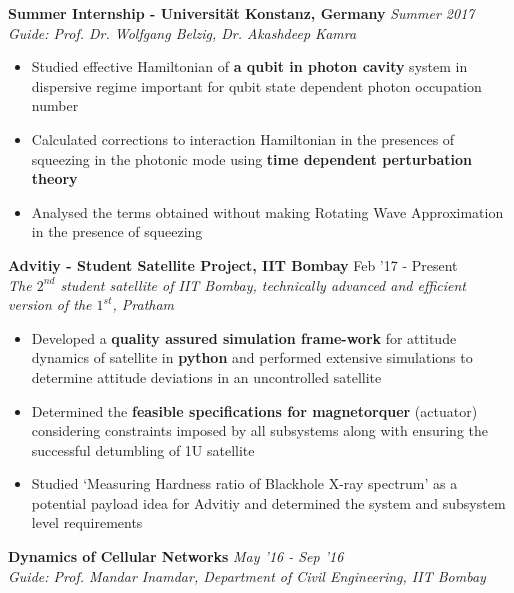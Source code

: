 \documentclass[10pt]{article}%
\begin{document}
{{\flushleft \bf \large{Summer Internship - Universit\"{a}t Konstanz, Germany}}  \hfill \textit{Summer 2017} \\
{\em Guide: Prof. Dr. Wolfgang Belzig, Dr. Akashdeep Kamra }\\
\vspace{-5mm}
\begin{itemize}
    \setlength\itemsep{0.01em}
    \item Studied effective Hamiltonian of \textbf{a qubit in photon cavity} system in dispersive regime important for qubit state dependent photon occupation number
    \item Calculated corrections to interaction Hamiltonian in the presences of squeezing in the photonic mode using \textbf{time dependent perturbation theory}
    \item Analysed the terms obtained without making Rotating Wave Approximation in the presence of squeezing
\end{itemize}

{\flushleft \bf \large{Advitiy - Student Satellite Project, IIT Bombay}}  \hfill {{{Feb '17 - Present}}} \\
{\em The $\mathit{2^{nd}}$ student satellite of IIT Bombay, technically advanced and efficient version of the $\mathit{1^{st}}$, Pratham} 

\begin{itemize}
    \setlength\itemsep{0.01em}
    \item Developed a \textbf{quality assured simulation frame-work} for attitude dynamics of satellite in \textbf{python} and performed
extensive simulations to determine attitude deviations in an uncontrolled satellite
    \item Determined the \textbf{feasible specifications for magnetorquer} (actuator) considering constraints imposed by all subsystems along with ensuring the successful detumbling of 1U satellite 
    \item Studied `Measuring Hardness ratio of Blackhole X-ray spectrum' as a potential payload idea for Advitiy and determined the system and subsystem level requirements
\end{itemize}

{\flushleft \bf \large{Dynamics of Cellular Networks}}  \hfill \textit{May '16 - Sep '16} \\
{\em Guide: Prof. Mandar Inamdar, Department of Civil Engineering, IIT Bombay} 

}
\end{document}
